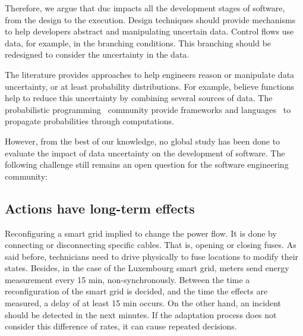 Therefore, we argue that \gls{duc} impacts all the development stages of software, from the design to the execution.
Design techniques should provide mechanisms to help developers abstract and manipulating uncertain data.
Control flows use data, for example, in the branching conditions.
This branching should be redesigned to consider the uncertainty in the data.

The literature provides approaches to help engineers reason or manipulate data uncertainty, or at least probability distributions.
For example, believe functions~\cite{shafer1992dempster} help to reduce this uncertainty by combining several sources of data.
The probabilistic programming~\cite{DBLP:conf/icse/GordonHNR14} community provide frameworks and languages~\cite{url:InferNET18, baudin2017openturns} to propagate probabilities through computations.

However, from the best of our knowledge, no global study has been done to evaluate the impact of data uncertainty on the development of software.
The following challenge still remains an open question for the software engineering community:
\vspace{-2em}




























\subsection{Actions have long-term effects}
Reconfiguring a smart grid implied to change the power flow.
It is done by connecting or disconnecting specific cables.
That is, opening or closing fuses.
As said before, technicians need to drive physically to fuse locations to modify their states.
Besides, in the case of the Luxembourg smart grid, meters send energy measurement every 15 min, non-synchronously.
Between the time a reconfiguration of the smart grid is decided, and the time the effects are measured, a delay of at least 15 min occurs.
On the other hand, an incident should be detected in the next minutes.
If the adaptation process does not consider this difference of rates, it can cause repeated decisions.

